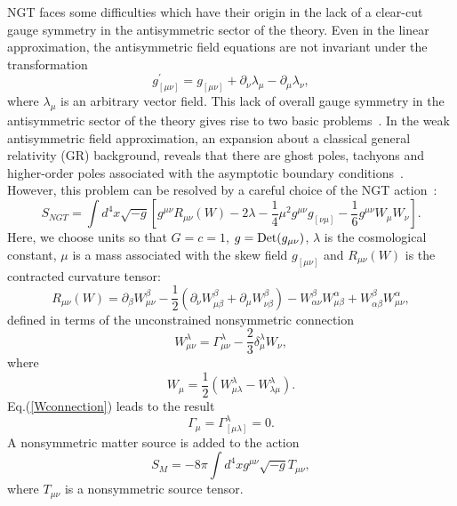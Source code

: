 \documentclass[a4paper,10pt]{article}
\begin{document}
NGT faces some difficulties which have their origin in the lack of a clear-cut gauge
symmetry in the antisymmetric sector of the theory. Even in the linear
approximation, the antisymmetric field equations are not invariant under
the transformation
\begin{equation}
g^\prime_{[\mu\nu]}=
g_{[\mu\nu]}+\partial_\nu\lambda_\mu-\partial_\mu\lambda_\nu,
\end{equation}
where $\lambda_\mu$ is an arbitrary vector field. This lack of
overall gauge symmetry in the antisymmetric sector of the theory
gives rise to two basic problems~\cite{Damour,Clayton,Clayton2}.
In the weak antisymmetric field approximation, an expansion about
a classical general relativity (GR) background, reveals that
there are ghost poles, tachyons and higher-order poles associated
with the asymptotic boundary conditions~\cite{Damour}. However,
this problem can be resolved by a careful choice of the NGT
action~\cite{Moffat8,Moffat9}: \begin{equation}
\label{NGTaction}
S_{NGT}=\int
d^4x\sqrt{-g}[g^{\mu\nu}R_{\mu\nu}(W)-2\lambda-\frac{1}{4}\mu^2g^{\mu\nu}g_{[\nu\mu]}
-\frac{1}{6}g^{\mu\nu}W_\mu W_\nu].
\end{equation}
Here, we choose units so that $G=c=1$, $g={\rm Det}(g_{\mu\nu})$, $\lambda$
is the cosmological constant, $\mu$ is a mass associated with the
skew field $g_{[\mu\nu]}$ and $R_{\mu\nu}(W)$ is the contracted curvature
tensor:
\begin{equation}
R_{\mu\nu}(W)=\partial_\beta
W^\beta_{\mu\nu}-\frac{1}{2}(\partial_\nu W^\beta_{\mu\beta}+\partial_\mu
W^\beta_{\nu\beta})-W^\beta_{\alpha\nu}W^\alpha_{\mu\beta}
+W^\beta_{\alpha\beta}W^\alpha_{\mu\nu},
\end{equation}
defined in terms of the unconstrained nonsymmetric connection
\begin{equation}
\label{Wconnection}
W^\lambda_{\mu\nu}=\Gamma^\lambda_{\mu\nu}-\frac{2}{3}\delta^\lambda_\mu
W_\nu, \end{equation}
where
\begin{equation}
W_\mu=\frac{1}{2}(W^\lambda_{\mu\lambda}-W^\lambda_{\lambda\mu}).
\end{equation}
Eq.(\ref{Wconnection}) leads to the result
\begin{equation}
\Gamma_\mu=\Gamma^\lambda_{[\mu\lambda]}=0.
\end{equation}
A nonsymmetric matter source is added to the action
\begin{equation}
S_M=-8\pi\int d^4xg^{\mu\nu}\sqrt{-g}T_{\mu\nu},
\end{equation}
where $T_{\mu\nu}$ is a nonsymmetric source tensor.
\end{document}
